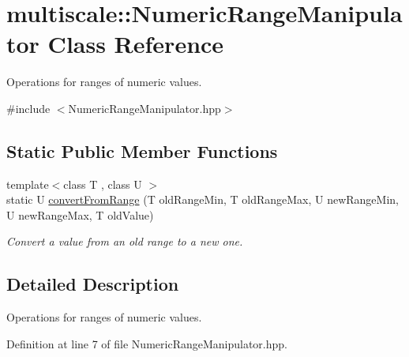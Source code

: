 \hypertarget{classmultiscale_1_1NumericRangeManipulator}{\section{multiscale\-:\-:\-Numeric\-Range\-Manipulator \-Class \-Reference}
\label{classmultiscale_1_1NumericRangeManipulator}
}


\-Operations for ranges of numeric values.  




{\ttfamily \#include $<$\-Numeric\-Range\-Manipulator.\-hpp$>$}

\subsection*{\-Static \-Public \-Member \-Functions}
\begin{DoxyCompactItemize}
\item 
{\footnotesize template$<$class T , class U $>$ }\\static \-U \hyperlink{classmultiscale_1_1NumericRangeManipulator_a4459c449fb7ebc07bcb8934d3a860e7e}{convert\-From\-Range} (\-T old\-Range\-Min, \-T old\-Range\-Max, \-U new\-Range\-Min, \-U new\-Range\-Max, \-T old\-Value)
\begin{DoxyCompactList}\small\item\em \-Convert a value from an old range to a new one. \end{DoxyCompactList}\end{DoxyCompactItemize}


\subsection{\-Detailed \-Description}
\-Operations for ranges of numeric values. 

\-Definition at line 7 of file \-Numeric\-Range\-Manipulator.\-hpp.



